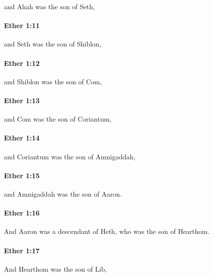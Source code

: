 			and Ahah was the son of Seth,

		\paragraph{Ether 1:11} %
			\label{ETHER-1-11}

			and Seth was the son of Shiblon,

		\paragraph{Ether 1:12} %
			\label{ETHER-1-12}

			and Shiblon was the son of Com,

		\paragraph{Ether 1:13} %
			\label{ETHER-1-13}

			and Com was the son of Coriantum,

		\paragraph{Ether 1:14} %
			\label{ETHER-1-14}

			and Coriantum was the son of Amnigaddah,

		\paragraph{Ether 1:15} %
			\label{ETHER-1-15}

			and Amnigaddah was the son of Aaron.

		\paragraph{Ether 1:16} %
			\label{ETHER-1-16}

			And Aaron was a descendant of Heth,
			who was the son of Hearthom.

		\paragraph{Ether 1:17} %
			\label{ETHER-1-17}

			And Hearthom was the son of Lib,

